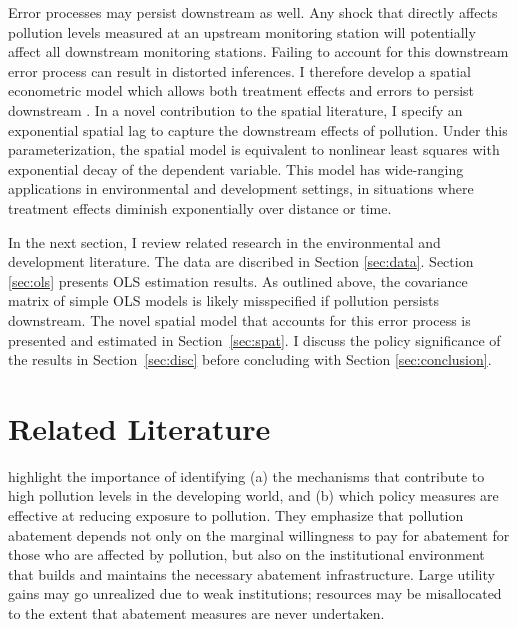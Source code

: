 \documentclass[12pt]{article}
\renewcommand{\citet}[1]{\citeauthor{#1} \citeyearpar{#1}}
\begin{document}
Error processes may persist downstream as well. Any shock that directly affects pollution levels measured at an upstream monitoring station will potentially affect all downstream monitoring stations. Failing to account for this downstream error process can result in distorted inferences. I therefore develop a spatial econometric model which allows both treatment effects and errors to persist downstream \citep{anselin1988, lesage2009}. In a novel contribution to the spatial literature, I specify an exponential spatial lag to capture the downstream effects of pollution. Under this parameterization, the spatial model is equivalent to nonlinear least squares with exponential decay of the dependent variable. This model has wide-ranging applications in environmental and development settings, in situations where treatment effects diminish exponentially over distance or time. 

In the next section, I review related research in the environmental and development literature. The data are discribed in Section \ref{sec:data}. Section \ref{sec:ols} presents OLS estimation results. As outlined above, the covariance matrix of simple OLS models is likely misspecified if pollution persists downstream. The novel spatial model that accounts for this error process is presented and estimated in \mbox{Section \ref{sec:spat}}. I discuss the policy significance of the results in \mbox{Section \ref{sec:disc}} before concluding with Section \ref{sec:conclusion}.

\section{Related Literature} \label{sec:lit}

\citet{greenstone2015} highlight the importance of identifying (a) the mechanisms that contribute to high pollution levels in the developing world, and (b) which policy measures are effective at reducing exposure to pollution. They emphasize that pollution abatement depends not only on the marginal willingness to pay for abatement for those who are affected by pollution, but also on the institutional environment that builds and maintains the necessary abatement infrastructure. Large utility gains may go unrealized due to weak institutions; resources may be misallocated to the extent that abatement measures are never undertaken.
\end{document}
